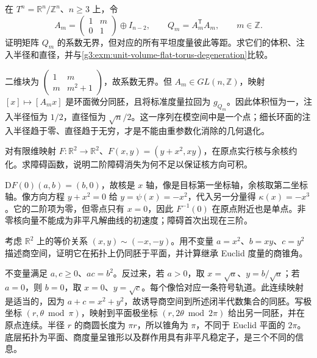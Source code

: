 \begin{exercise}\label{g3:ex:einstein-flat-torus-reparametrization}
	在 \(T^n=\mathbb R^n/\mathbb Z^n\)、\(n\ge3\) 上，令
	\[
		A_m=\begin{pmatrix}1&m\\0&1\end{pmatrix}\oplus I_{n-2},\qquad
		Q_m=A_m^{\mathsf T}A_m,\qquad m\in\mathbb Z.
	\]
	证明矩阵 \(Q_m\) 的系数无界，但对应的所有平坦度量彼此等距。求它们的体积、注入半径和直径，并与\cref{g3:exm:unit-volume-flat-torus-degeneration}比较。
\end{exercise}
\begin{solution}
	二维块为 \(\left(\begin{smallmatrix}1&m\\m&m^2+1\end{smallmatrix}\right)\)，故系数无界。但 \(A_m\in GL(n,\mathbb Z)\)，映射 \([x]\mapsto[A_mx]\) 是环面微分同胚，且将标准度量拉回为 \(g_{Q_m}\)。因此体积恒为一，注入半径恒为 \(1/2\)，直径恒为 \(\sqrt n/2\)。这一序列在模空间中是一个点；细长环面的注入半径趋于零、直径趋于无穷，才是不能由重参数化消除的几何退化。
\end{solution}

\begin{exercise}\label{g3:ex:einstein-cubic-obstruction-model}
	对有限维映射 \(F:\mathbb R^2\to\mathbb R^2\)、\(F(x,y)=(y+x^2,xy)\)，在原点实行核与余核约化。求障碍函数，说明二阶障碍消失为何不足以保证核方向可积。
\end{exercise}
\begin{solution}
	\(\mathrm DF(0)(a,b)=(b,0)\)，故核是 \(x\) 轴，像是目标第一坐标轴，余核取第二坐标轴。像方向方程 \(y+x^2=0\) 给 \(y=\psi(x)=-x^2\)，代入另一分量得 \(\kappa(x)=-x^3\)。它的二阶项为零，但零点只有 \(x=0\)，因此 \(F^{-1}(0)\) 在原点附近也是单点。非零核向量不能成为非平凡解曲线的初速度；障碍首次出现在三阶。
\end{solution}

\begin{exercise}\label{g3:ex:einstein-sign-quotient}
	考虑 \(\mathbb R^2\) 上的等价关系 \((x,y)\sim(-x,-y)\)。用不变量 \(a=x^2\)、\(b=xy\)、\(c=y^2\) 描述商空间，证明它在拓扑上仍同胚于平面，并计算继承 Euclid 度量的商锥角。
\end{exercise}
\begin{solution}
	不变量满足 \(a,c\ge0\)、\(ac=b^2\)。反过来，若 \(a>0\)，取 \(x=\sqrt a\)、\(y=b/\sqrt a\)；若 \(a=0\)，则 \(b=0\)，取 \(x=0\)、\(y=\sqrt c\)。每个像恰对应一条符号轨道。此连续映射是适当的，因为 \(a+c=x^2+y^2\)，故诱导商空间到所述闭半代数集合的同胚。写极坐标 \((r,\theta\bmod\pi)\)，映射到平面极坐标 \((r,2\theta\bmod2\pi)\) 给出另一同胚，并在原点连续。半径 \(r\) 的商圆长度为 \(\pi r\)，所以锥角为 \(\pi\)，不同于 Euclid 平面的 \(2\pi\)。底层拓扑为平面、商度量呈锥形以及群作用具有非平凡稳定子，是三个不同的信息。
\end{solution}

